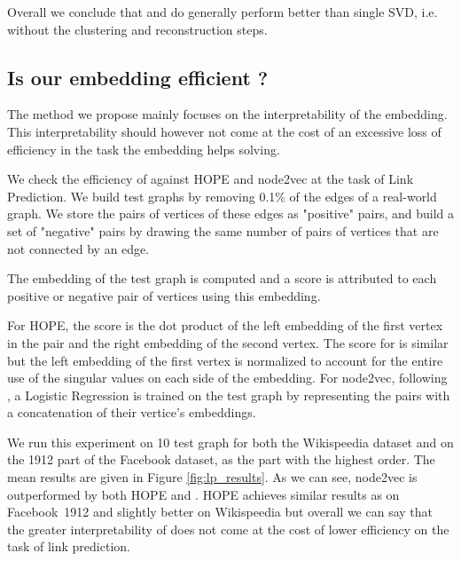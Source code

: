 Overall we conclude that \newembLeft and \newembRight do generally perform better than single SVD, i.e. without the clustering and reconstruction steps.

\subsection{Is our embedding efficient ?}
The method we propose mainly focuses on the interpretability of the embedding. This interpretability should however not come at the cost of an excessive loss of efficiency in the task the embedding helps solving.

We check the efficiency of \parfaite against HOPE and node2vec at the task of Link Prediction. We build test graphs by removing 0.1\% of the edges of a real-world graph. We store the pairs of vertices of these edges as "positive" pairs, and build a set of "negative" pairs by drawing the same number of pairs of vertices that are not connected by an edge.

The embedding of the test graph is computed and a score is attributed to each positive or negative pair of vertices using this embedding.

For HOPE, the score is the dot product of the left embedding of the first vertex in the pair and the right embedding of the second vertex. The score for \parfaite is similar but the left embedding of the first vertex is normalized to account for the entire use of the singular values on each side of the embedding. For node2vec, following \cite{groverNode2vecScalableFeature2016}, a Logistic Regression is trained on the test graph by representing the pairs with a concatenation of their vertice's embeddings.

We run this experiment on 10 test graph for both the Wikispeedia dataset and on the 1912 part of the Facebook dataset, as the part with the highest order. The mean results are given in Figure \ref{fig:lp_results}. As we can see, node2vec is outperformed by both HOPE and \parfaite. HOPE achieves similar results as \parfaite  on Facebook~1912 and slightly better on Wikispeedia but overall we can say that the greater interpretability of \parfaite does not come at the cost of lower efficiency on the task of link prediction.


